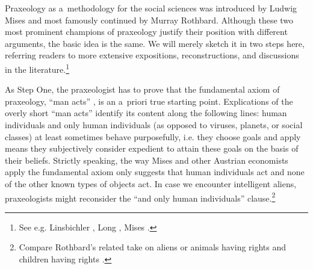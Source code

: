Praxeology as a~methodology for the social sciences was introduced by Ludwig Mises and most famously continued by Murray Rothbard. Although these two most prominent champions of praxeology justify their position with different arguments, the basic idea is the same. We will merely sketch it in two steps here, referring readers to more extensive expositions, reconstructions, and discussions in the literature.\footnote{See e.g. Linsbichler 
\parencites*[][]{linsbichler_was_2017}[][]{linsbichler_austrian_2021}, %
 Long 
\parencite*[][]{long_wittgenstein_2008}, %
 Mises 
\parencites*[][]{mises_nationalokonomie_1940}[][]{mises_epistemological_2003}[][]{mises_theory_2007}[][]{mises_ultimate_1962}[][]{mises_ultimate_2012}.%
}



As Step One, the praxeologist has to prove that the fundamental axiom of praxeology, ``man acts'' 
\parencite[see, e.g.][p.4]{mises_ultimate_2012}, %
 is an a~priori true starting point. Explications of the overly short ``man acts'' identify its content along the following lines: human individuals and only human individuals (as opposed to viruses, planets, or social classes) at least sometimes behave purposefully, i.e. they choose goals and apply means they subjectively consider expedient to attain these goals on the basis of their beliefs. Strictly speaking, the way Mises and other Austrian economists apply the fundamental axiom only suggests that human individuals act and none of the other known types of objects act. In case we encounter intelligent aliens, praxeologists might reconsider the ``and only human individuals'' clause.\footnote{Compare Rothbard's related take on aliens or animals having rights 
\parencite[][pp.155–157]{rothbard_ethics_1998} %
 and children having rights 
\parencite[][pp.97–112]{rothbard_ethics_1998}.%
}



